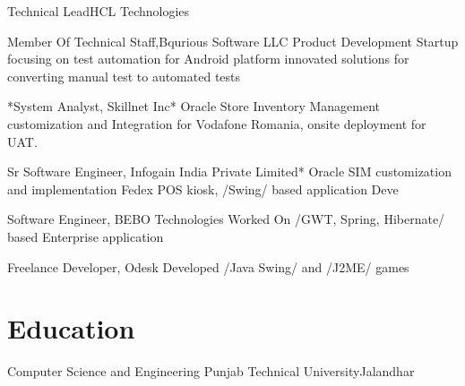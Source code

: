 \documentclass[11pt,a4paper,sans]{moderncv}        %
\begin{document}
 {Technical Lead}{HCL Technologies}  {}{}

    {Member Of Technical Staff},{Bqurious Software LLC}                            
  {Product Development}                                                
  {Startup focusing on test automation for Android platform}          
  {innovated solutions for converting manual test to automated tests} 

    {*System Analyst, Skillnet Inc*}                                     
  Oracle Store Inventory Management                                 
  customization and Integration for Vodafone Romania,                
  onsite deployment for UAT.                                         

    {Sr Software Engineer,}{ Infogain India Private Limited*}             
  {Oracle SIM customization and implementation}                        
  {Fedex POS kiosk, /Swing/ based application Deve}                    

    {Software Engineer}, {BEBO Technologies }                            
  {Worked On /GWT, Spring, Hibernate/ based Enterprise application}    

    {Freelance Developer}, {Odesk }                                      
  {Developed /Java Swing/ and /J2ME/ games}                            

  \section{Education}

  {Computer Science and Engineering}
  {Punjab Technical University}{Jalandhar} 
  {}{}                                   
    {}{}                                  
\end{document}
